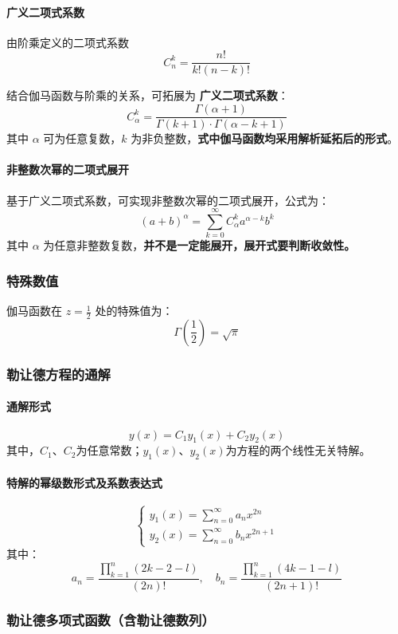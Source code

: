 \documentclass{article}
\begin{document}
	\paragraph{广义二项式系数}
	由阶乘定义的二项式系数 $$C_n^k=\frac{n!}{k!(n-k)!}$$
	
	结合伽马函数与阶乘的关系，可拓展为 \textbf{广义二项式系数}：
	\[
	C_\alpha^k=\frac{\Gamma(\alpha+1)}{\Gamma(k+1)\cdot\Gamma(\alpha-k+1)}
	\]
	其中 $\alpha$ 可为任意复数，$k$ 为非负整数，\textbf{式中伽马函数均采用解析延拓后的形式}。
	
	\paragraph{非整数次幂的二项式展开}
	基于广义二项式系数，可实现非整数次幂的二项式展开，公式为：
	\[
	(a+b)^\alpha=\sum_{k=0}^{\infty}C_\alpha^k a^{\alpha-k}b^k
	\]
	其中 $\alpha$ 为任意非整数复数，\textbf{并不是一定能展开，展开式要判断收敛性。}
	
	\subsubsection{特殊数值}
	伽马函数在 $z=\frac{1}{2}$ 处的特殊值为：
	\[
	\Gamma\left(\frac{1}{2}\right)=\sqrt{\pi}
	\]
	
	\subsubsection{勒让德方程的通解}
	
	\paragraph{通解形式}
	\[
	y(x) = C_1 y_1(x) + C_2 y_2(x)
	\]
	其中，\(C_1\)、\(C_2\)为任意常数；\(y_1(x)\)、\(y_2(x)\)为方程的两个线性无关特解。
	
	\paragraph{特解的幂级数形式及系数表达式}
	\[
	\begin{cases} 
		y_1(x) = \sum_{n=0}^{\infty} a_n x^{2n} \\
		y_2(x) = \sum_{n=0}^{\infty} b_n x^{2n + 1}
	\end{cases}
	\]
	其中：
	\[
	a_n = \frac{\prod_{k=1}^{n} (2k - 2 - l)}{(2n)!}, \quad 
	b_n = \frac{\prod_{k=1}^{n} (4k - 1 - l)}{(2n + 1)!}
	\]
	
	\subsubsection{勒让德多项式函数（含勒让德数列）}
	
\end{document}
